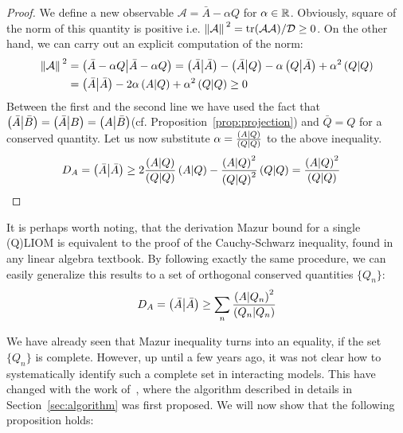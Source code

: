 \begin{proof}
  We define a new observable \(\mathcal{A} = \bar{A} - \alpha Q\) for \(\alpha \in \mathbb{R}\).
  Obviously, square of the norm of this quantity is positive i.e. \(\norm*{\mathcal{A}}^2 = 
  \tr(\mathcal{A}\mathcal{A})/\mathcal{D} \geq 0\). On the other hand, we can carry out an
  explicit computation of the norm:
  \begin{align*}
  \norm*{\mathcal{A}}^2 &= \left(\bar{A}-\alpha Q \middle| \bar{A}-\alpha Q\right) = \left(\bar{A} \middle| \bar{A}\right) - 
  \left(\bar{A} \middle| Q\right) - \alpha \left(Q \middle| \bar{A}\right) + \alpha^2 \left(Q \middle| Q\right) \\
  &= \left(\bar{A} \middle| \bar{A}\right) - 2\alpha \left(A \middle| Q\right) + \alpha^2 \left(Q \middle| Q\right) \geq 0
  \end{align*}
  Between the first and the second line we have used the fact that \(\left(\bar{A} \middle| \bar{B}\right) = 
  \left(\bar{A} \middle| B\right) = \left(A \middle| \bar{B}\right)\)(cf. Proposition~\ref{prop:projection}) and \(\bar{Q} = Q\) 
  for a conserved quantity. Let us now substitute \(\alpha = \frac{\left(A \middle| Q\right)}{\left(Q \middle| Q\right)}\) to the
  above inequality.
  \begin{align*}
    D_A = \left(\bar{A} \middle| \bar{A}\right) &\geq 2 \frac{\left(A \middle| Q\right)}{\left(Q \middle| Q\right)} \left(A \middle| Q\right) - \frac{\left(A \middle| Q\right)^2}{\left(Q \middle| Q\right)^2}\left(Q \middle| Q\right)
    = \frac{\left(A \middle| Q\right)^2}{\left(Q \middle| Q\right)}
  \end{align*}
  \label{proof:single mazur}  
\end{proof}
It is perhaps worth noting, that the derivation Mazur bound for a single (Q)LIOM is equivalent to the proof of
the Cauchy-Schwarz inequality, found in any linear algebra textbook. By following exactly the same procedure, 
we can easily generalize this results to a set of orthogonal conserved quantities \(\{Q_{n}\}\):
\begin{equation}
  D_A = \left(\bar{A} \middle| \bar{A}\right) \geq \sum_{n} \frac{\left(A \middle| Q_n\right)^2}{\left(Q_n \middle| Q_n\right)}
\end{equation}

We have already seen that Mazur inequality turns into an equality, if the set \(\{Q_n\}\) is complete. However,
up until a few years ago, it was not clear how to systematically identify such a complete set in interacting models.
This have changed with the work of~\textcite{Mierzejewski2015a}, where the algorithm described in details
in Section~\ref{sec:algorithm} was first proposed. We will now show that the following proposition holds:

